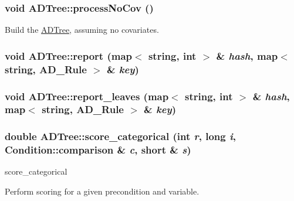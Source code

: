 \hypertarget{classADTree_acd444c9e1e4fb4a95ee662f1be89c1cb}{
\subsubsection[{processNoCov}]{\setlength{\rightskip}{0pt plus 5cm}void ADTree::processNoCov ()}}
\label{classADTree_acd444c9e1e4fb4a95ee662f1be89c1cb}
Build the \hyperlink{classADTree}{ADTree}, assuming no covariates. \hypertarget{classADTree_a544f723a8c49a74f554fb04d3a78cea6}{
\subsubsection[{report}]{\setlength{\rightskip}{0pt plus 5cm}void ADTree::report (map$<$ string, int $>$ \& {\em hash}, \/  map$<$ string, {\bf AD\_\-Rule} $>$ \& {\em key})}}
\label{classADTree_a544f723a8c49a74f554fb04d3a78cea6}
\hypertarget{classADTree_ab1fb3de26e2af354385c44eba2d17a98}{
\subsubsection[{report\_\-leaves}]{\setlength{\rightskip}{0pt plus 5cm}void ADTree::report\_\-leaves (map$<$ string, int $>$ \& {\em hash}, \/  map$<$ string, {\bf AD\_\-Rule} $>$ \& {\em key})}}
\label{classADTree_ab1fb3de26e2af354385c44eba2d17a98}
\hypertarget{classADTree_a6e496b6bfad8f6b5db794728d7eaa426}{
\subsubsection[{score\_\-categorical}]{\setlength{\rightskip}{0pt plus 5cm}double ADTree::score\_\-categorical (int {\em r}, \/  long {\em i}, \/  {\bf Condition::comparison} \& {\em c}, \/  short \& {\em s})}}
\label{classADTree_a6e496b6bfad8f6b5db794728d7eaa426}
score\_\-categorical

Perform scoring for a given precondition and variable.


